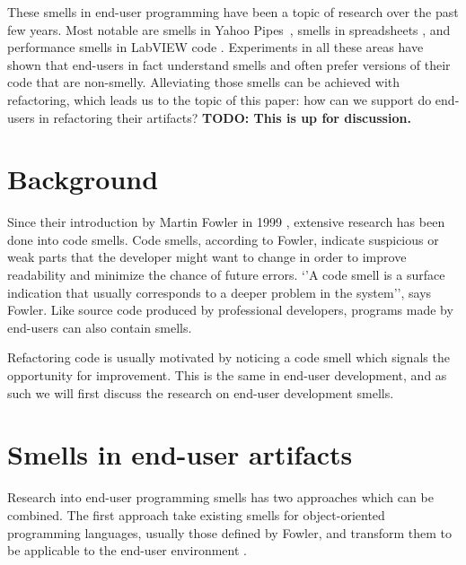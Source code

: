 \documentclass[10pt,conference,compsocconf]{IEEEtran}
\newcommand{\todo}[1]{\textbf{TODO: #1}}
\begin{document}
These smells in end-user programming have been a topic of research over the past few years. Most notable are smells in Yahoo Pipes~\cite{Stolee2011}, smells in spreadsheets \cite{Hermans2012inter}, and performance smells in LabVIEW code \cite{chambers2013smell}. Experiments in all these areas have shown that end-users in fact understand smells and often prefer versions of their code that are non-smelly. Alleviating those smells can be achieved with refactoring, which leads us to the topic of this paper: how can we support do end-users in refactoring their artifacts? \todo{This is up for discussion.}

\section{Background}
\label{sec:background}

Since their introduction by Martin Fowler in 1999 \cite{Fowl1999}, extensive research has been done into code smells. Code smells, according to Fowler, indicate suspicious or weak parts that the developer might want to change in order to improve readability and minimize the chance of future errors. `'A code smell is a surface indication that usually corresponds to a deeper problem in the system'', says Fowler. Like source code produced by professional developers, programs made by end-users can also contain smells.

Refactoring code is usually motivated by noticing a code smell which signals the opportunity for improvement.
This is the same in end-user development, and as such we will first discuss the research on end-user development smells.

\section{Smells in end-user artifacts}
\label{sec:smells}
Research into end-user programming smells has two approaches which can be combined.
The first approach take existing smells for object-oriented programming languages, usually those defined by Fowler, and transform them to be applicable to the end-user environment \cite{Hermans2012inter,Hermans2012intra,Stolee2011}.
\end{document}
